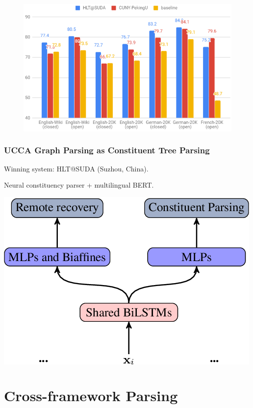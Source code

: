 \documentclass[t,xcolor={svgnames,table}]{beamer}
\begin{document}
\begin{frame}
    \begin{figure}
        \centering
        \includegraphics[width=\textwidth]{Capture}
    \end{figure}
\end{frame}



\begin{frame}
\frametitle{UCCA Graph Parsing as Constituent Tree Parsing}
Winning system: HLT@SUDA (Suzhou, China).

Neural constituency parser + multilingual BERT.
\begin{center}
\includegraphics[width=.6\textwidth]{hltsuda3}
\end{center}
\end{frame}


\section{Cross-framework Parsing}
\end{document}
